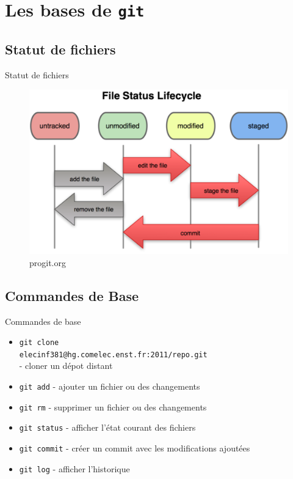 \documentclass{beamer}
\newcommand{\git}{\texttt{git}\xspace}
\begin{document}
\section{Les bases de \git}
\subsection*{Statut de fichiers}
\begin{frame}{Statut de fichiers}
  \begin{figure}
    \begin{center}
      \includegraphics[scale=0.7]{img/Status_lifecycle.png}
    \end{center}
    \caption{progit.org}
  \end{figure}
\end{frame}

\subsection*{Commandes de Base}
\begin{frame}[containsverbatim]{Commandes de base}
  \begin{itemize}
  \item \lstinline|git clone| \\
    \lstinline|elecinf381@hg.comelec.enst.fr:2011/repo.git| \\
    - cloner un dépot distant
  \item \lstinline|git add| - ajouter un fichier ou des changements
  \item \lstinline|git rm| - supprimer un fichier ou des changements
  \item \lstinline|git status| - afficher l'état courant des fichiers
  \item \lstinline|git commit| - créer un commit avec les modifications ajoutées
  \item \lstinline|git log| - afficher l'historique
  \end{itemize}
\end{frame}
\end{document}
